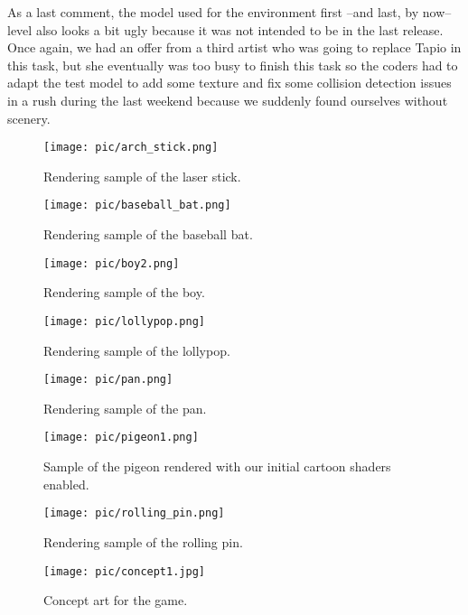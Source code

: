 \documentclass[a4paper,10pt]{article}
\begin{document}
As a last comment, the model used for the environment first --and
last, by now-- level also looks a bit ugly because it was not intended
to be in the last release. Once again, we had an offer from a third
artist who was going to replace Tapio in this task, but she eventually
was too busy to finish this task so the coders had to adapt the test
model to add some texture and fix some collision detection issues in
a rush during the last weekend because we suddenly found ourselves
without scenery.

\begin{figure}[h!]
  \centering
  \texttt{[image: pic/arch\_stick.png]}
  \caption{Rendering sample of the laser stick.}
\end{figure}

\begin{figure}[h!]
  \centering
  \texttt{[image: pic/baseball\_bat.png]}
  \caption{Rendering sample of the baseball bat.}
\end{figure}

\begin{figure}[h!]
  \centering
  \texttt{[image: pic/boy2.png]}
  \caption{Rendering sample of the boy.}
\end{figure}

\begin{figure}[h!]
  \centering
  \texttt{[image: pic/lollypop.png]}
  \caption{Rendering sample of the lollypop.}
\end{figure}

\begin{figure}[h!]
  \centering
  \texttt{[image: pic/pan.png]}
  \caption{Rendering sample of the pan.}
\end{figure}

\begin{figure}[h!]
  \centering
  \texttt{[image: pic/pigeon1.png]}
  \caption{Sample of the pigeon rendered with our initial cartoon
    shaders enabled.}
\end{figure}

\begin{figure}[h!]
  \centering
  \texttt{[image: pic/rolling\_pin.png]}
  \caption{Rendering sample of the rolling pin.}
\end{figure}

\begin{figure}[h!]
  \centering
  \texttt{[image: pic/concept1.jpg]}
  \caption{Concept art for the game.}
  \label{pic:sari}
\end{figure}
\end{document}
